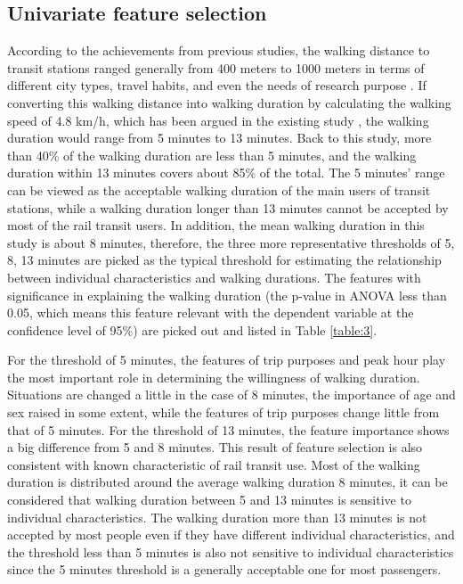\documentclass[Journal,letterpaper]{ascelike-new}
\begin{document}
\subsection{Univariate feature selection}
According to the achievements from previous studies, the walking distance to transit stations ranged generally from 400 meters to 1000 meters in terms of different city types, travel habits, and even the needs of research purpose \cite{Guerra2012,Murray1998,OSullivan1996,Keijer2000,Zhao2003,Alshalalfah2007}. If converting this walking distance into walking duration by calculating the walking speed of 4.8 km/h, which has been argued in the existing study \cite{Bohannon1997}, the walking duration would range from 5 minutes to 13 minutes. Back to this study, more than 40\% of the walking duration are less than 5 minutes, and the walking duration within 13 minutes covers about 85\% of the total. The 5 minutes’ range can be viewed as the acceptable walking duration of the main users of transit stations, while a walking duration longer than 13 minutes cannot be accepted by most of the rail transit users. In addition, the mean walking duration in this study is about 8 minutes, therefore, the three more representative thresholds of 5, 8, 13 minutes are picked as the typical threshold for estimating the relationship between individual characteristics and walking durations. The features with significance in explaining the walking duration (the p-value in ANOVA less than 0.05, which means this feature relevant with the dependent variable at the confidence level of 95\%) are picked out and listed in Table \ref{table:3}.

%
For the threshold of 5 minutes, the features of trip purposes and peak hour play the most important role in determining the willingness of walking duration. Situations are changed a little in the case of 8 minutes, the importance of age and sex raised in some extent, while the features of trip purposes change little from that of 5 minutes. For the threshold of 13 minutes, the feature importance shows a big difference from 5 and 8 minutes. This result of feature selection is also consistent with known characteristic of rail transit use. Most of the walking duration is distributed around the average walking duration 8 minutes, it can be considered that walking duration between 5 and 13 minutes is sensitive to individual characteristics. The walking duration more than 13 minutes is not accepted by most people even if they have different individual characteristics, and the threshold less than 5 minutes is also not sensitive to individual characteristics since the 5 minutes threshold is a generally acceptable one for most passengers.
\end{document}
